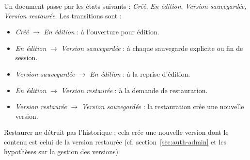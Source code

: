 Un document passe par les états suivants : \textit{Créé}, \textit{En édition}, \textit{Version sauvegardée}, \textit{Version restaurée}. Les transitions sont :

\begin{itemize}
    \item \textit{Créé} $\to$ \textit{En édition} : à l'ouverture pour édition.
    \item \textit{En édition} $\to$ \textit{Version sauvegardée} : à chaque sauvegarde explicite ou fin de session.
    \item \textit{Version sauvegardée} $\to$ \textit{En édition} : à la reprise d'édition.
    \item \textit{En édition} $\to$ \textit{Version restaurée} : à la demande de restauration.
    \item \textit{Version restaurée} $\to$ \textit{Version sauvegardée} : la restauration crée une nouvelle version.
\end{itemize}

\begin{infobox}
Restaurer ne détruit pas l'historique : cela crée une nouvelle version dont le contenu est celui de la version restaurée (cf. section~\ref{sec:auth-admin} et les hypothèses sur la gestion des versions).
\end{infobox}

